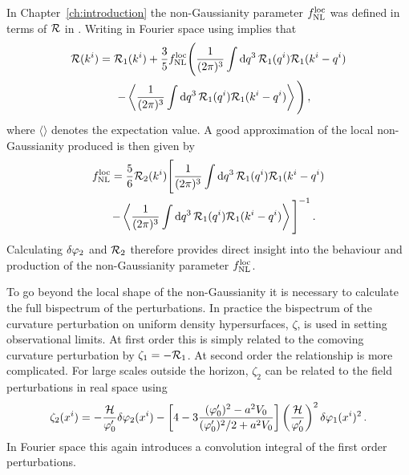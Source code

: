 In Chapter~\ref{ch:introduction} the non-Gaussianity parameter $f_{\mathrm{NL}}^\mathrm{loc}$ was defined
in terms of $\mathcal{R}$ in . Writing  in
Fourier space using  implies that
% 
\begin{multline}
 \R(\kvi) = \R_1(\kvi)
  + \frac{3}{5}\fnlloc \Bigg( \frac{1}{(2\pi)^3}\int \d q^3\, \R_1(\qvi)
\R_1(\kvi-\qvi) \\ 
% 
  \quad- \left\langle \frac{1}{(2\pi)^3} \int \d q^3\, \R_1(\qvi)
\R_1(\kvi-\qvi) \right\rangle \Bigg) \,,
\end{multline}
% 
where $\langle \rangle$ denotes the expectation value.
A good approximation of the local non-Gaussianity produced is then given by
% 
\begin{multline}
 \label{eq:fnlloc-perts}
\fnlloc = \frac{5}{6} \R_2(\kvi) \Bigg[ \frac{1}{(2\pi)^3}\int \d q^3\, \R_1(\qvi)
\R_1(\kvi-\qvi) \\
% 
  \quad- \left\langle \frac{1}{(2\pi)^3} \int \d q^3\, \R_1(\qvi)
\R_1(\kvi-\qvi) \right\rangle \Bigg]^{-1} \,.
\end{multline}
% 
Calculating $\delta\varphi_{2}$ and $\mathcal{R}_2$ therefore provides direct insight into the behaviour
and
production of the non-Gaussianity parameter $f_{\mathrm{NL}}^\mathrm{loc}$. 


To go beyond the local shape of the non-Gaussianity it is necessary to calculate the full
bispectrum of the perturbations. In practice the bispectrum of the curvature perturbation on
uniform density hypersurfaces, $\zeta$, is used in setting observational limits. At first order this
is simply related to the comoving curvature perturbation by $\zeta_1 = -\mathcal{R}_1$. At second order the
relationship is more complicated. For large scales outside the horizon, $\zeta_2$ can be related to
the field perturbations in real space using \cite{Malik:2005cy}
% 
\begin{equation}
 \zeta_2(x^i) = -\frac{\mathcal{H}}{\varphi_0'}\delta\varphi_{2}(x^i) - \left[4 - 3\frac{(\varphi_0')^2 - a^2V_{0}}{(\varphi_0')^2/2
+a^2V_{0}} \right]\left(\frac{\mathcal{H}}{\varphi_0'} \right)^2 \delta\varphi_{1}(x^i)^2\,. 
\end{equation}
% 
In Fourier space this again introduces a convolution integral of the first order perturbations.

